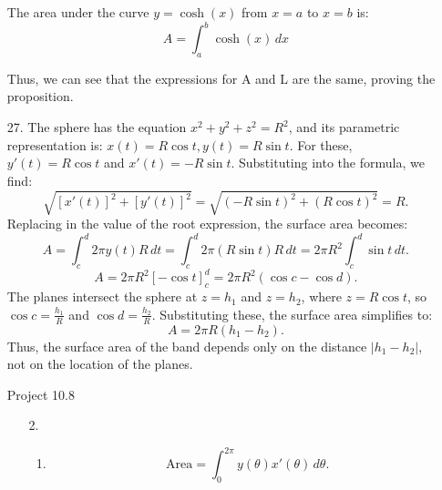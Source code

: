 \documentclass[12pt]{article}
\begin{document}
\begin{enumerate}
The area under the curve \(y = \cosh(x)\) from \(x = a\) to \(x = b\) is:
\[
A = \int_a^b \cosh(x) \, dx
\]

Thus, we can see that the expressions for A and L are the same, proving the proposition.

\item [27.] The sphere has the equation \( x^2 + y^2 + z^2 = R^2 \), and its parametric representation is:
\( x(t) = R\cos t, y(t) = R\sin t \). 
For these, \( y'(t) = R\cos t \) and \( x'(t) = -R\sin t \). Substituting into the formula, we find:
\[
\sqrt{\left[x'(t)\right]^2 + \left[y'(t)\right]^2} = \sqrt{(-R\sin t)^2 + (R\cos t)^2} = R.
\]
Replacing in the value of the root expression, the surface area becomes:
\[
A = \int_c^d 2\pi y(t) R \, dt = \int_c^d 2\pi (R\sin t) R \, dt = 2\pi R^2 \int_c^d \sin t \, dt.
\]
\[
A = 2\pi R^2 \left[ -\cos t \right]_c^d = 2\pi R^2 \left( \cos c - \cos d \right).
\]
The planes intersect the sphere at \( z = h_1 \) and \( z = h_2 \), where \( z = R\cos t \), so \( \cos c = \frac{h_1}{R} \) and \( \cos d = \frac{h_2}{R} \). Substituting these, the surface area simplifies to:
\[
A = 2\pi R \left( h_1 - h_2 \right).
\]
Thus, the surface area of the band depends only on the distance \( |h_1 - h_2| \), not on the location of the planes.

\item [Project 10.8]

\begin{enumerate}
    \item [2. ]
\begin{enumerate}

The parametric equations for the cycloid are:
\[
x(\theta) = R(\theta - \sin\theta), \quad y(\theta) = R(1 - \cos\theta).
\]

The derivatives are:
\[
x'(\theta) = R(1 - \cos\theta), \quad y'(\theta) = R\sin\theta.
\]

At the end of each arch, \( \theta = 2n\pi \) (where \( n \) is an integer).

- Substituting \( \theta = 2n\pi \) into \( x'(\theta) \):
\[
x'(2n\pi) = R(1 - \cos(2n\pi)) = R(1 - 1) = 0.
\]

- Substituting \( \theta = 2n\pi \) into \( y'(\theta) \):
\[
y'(2n\pi) = R\sin(2n\pi) = R(0) = 0.
\]

Thus, \( x' \) and \( y' \) are both 0 at the end of each arch.

\item

\[
\text{Area} = \int_{0}^{2\pi} y(\theta) x'(\theta) \, d\theta.
\]


\end{enumerate}
\end{enumerate}
\end{enumerate}
\end{document}
